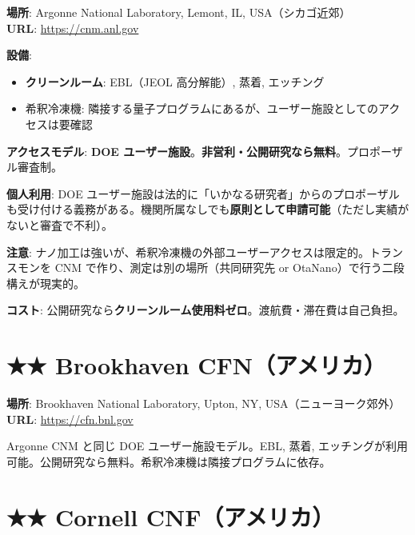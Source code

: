 \documentclass[12pt,a4paper]{article}
\begin{document}
\begin{facbox}
\textbf{場所}: Argonne National Laboratory, Lemont, IL, USA（シカゴ近郊）\\
\textbf{URL}: \url{https://cnm.anl.gov}

\textbf{設備}:
\begin{itemize}
\item \textbf{クリーンルーム}: EBL（JEOL 高分解能）, 蒸着, エッチング
\item 希釈冷凍機: 隣接する量子プログラムにあるが、ユーザー施設としてのアクセスは要確認
\end{itemize}

\textbf{アクセスモデル}: \textbf{DOE ユーザー施設}。\textbf{非営利・公開研究なら無料}。プロポーザル審査制。

\textbf{個人利用}: DOE ユーザー施設は法的に「いかなる研究者」からのプロポーザルも受け付ける義務がある。機関所属なしでも\textbf{原則として申請可能}（ただし実績がないと審査で不利）。

\textbf{注意}: ナノ加工は強いが、希釈冷凍機の外部ユーザーアクセスは限定的。トランスモンを CNM で作り、測定は別の場所（共同研究先 or OtaNano）で行う二段構えが現実的。

\textbf{コスト}: 公開研究なら\textbf{クリーンルーム使用料ゼロ}。渡航費・滞在費は自己負担。
\end{facbox}

\section{★★ Brookhaven CFN（アメリカ）}

\begin{facbox}
\textbf{場所}: Brookhaven National Laboratory, Upton, NY, USA（ニューヨーク郊外）\\
\textbf{URL}: \url{https://cfn.bnl.gov}

Argonne CNM と同じ DOE ユーザー施設モデル。EBL, 蒸着, エッチングが利用可能。公開研究なら無料。希釈冷凍機は隣接プログラムに依存。
\end{facbox}

\section{★★ Cornell CNF（アメリカ）}
\end{document}
